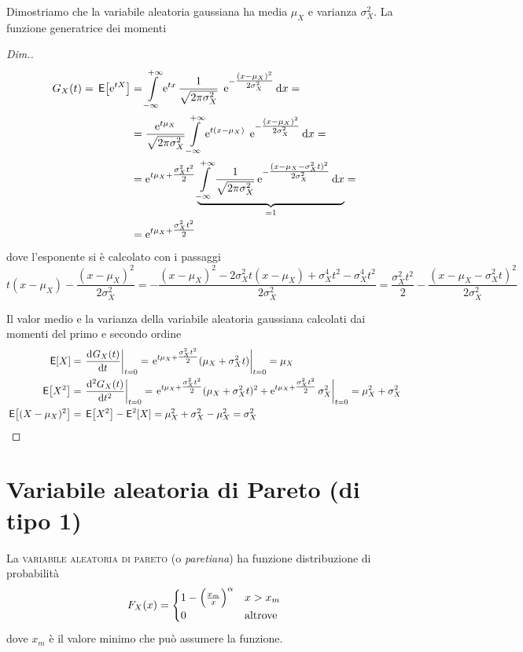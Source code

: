 Dimostriamo che la variabile aleatoria gaussiana ha media $\mu_X$ e varianza $\sigma^2_X$. La funzione generatrice dei momenti
\begin{proof}[Dim.]
\[\begin{split}G_X(t)=\,{\operatorname{\mathsf{E}}}\!\left[{\operatorname{e}^{t X}}\right]&=\int\limits_{-\infty}^{+\infty}{\operatorname{e}^{t x}\frac{1}{\sqrt{2\pi\sigma^2_X}}\;\operatorname{e}^{-\tfrac{(x-\mu_X)^2}{2\sigma^2_X}}}{\,\mathop{}\!\mathrm{d}{x}}=\\
&=\frac{\operatorname{e}^{t\mu_X}}{\sqrt{2\pi\sigma^2_X}}\int\limits_{-\infty}^{+\infty}{\operatorname{e}^{t (x-\mu_X)}\;\operatorname{e}^{-\tfrac{(x-\mu_X)^2}{2\sigma^2_X}}}{\,\mathop{}\!\mathrm{d}{x}}=\\
&=\operatorname{e}^{t\mu_X+\tfrac{\sigma^2_X t^2}{2}}\underbrace{\int\limits_{-\infty}^{+\infty}{\frac{1}{\sqrt{2\pi\sigma^2_X}}\operatorname{e}^{-\tfrac{(x-\mu_X-\sigma^2_X t)^2}{2\sigma^2_X}}}{\,\mathop{}\!\mathrm{d}{x}}}_{=1}=\\
&=\operatorname{e}^{t\mu_X+\tfrac{\sigma^2_X t^2}{2}}\end{split}\]
dove l'esponente si è calcolato con i passaggi
\[t(x-\mu_X)-\frac{(x-\mu_X)^2}{2\sigma^2_X}=-\frac{(x-\mu_X)^2-2\sigma^2_X t(x-\mu_X)+\sigma^4_X t^2-\sigma^4_X t^2}{2\sigma^2_X}=\frac{\sigma^2_X t^2}{2}-\frac{(x-\mu_X-\sigma^2_X t)^2}{2\sigma^2_X}\]

Il valor medio e la varianza della variabile aleatoria gaussiana calcolati dai momenti del primo e secondo ordine
\begin{equation}\begin{split}
\E{X}&=\restrict{\deriv{G_X(t)}{t}}{t=0}=\restrict{\e{t\mu_X+\tfrac{\sigma^2_X t^2}{2}}(\mu_X+\sigma^2_X t)}{t=0}=\mu_X
\\
\E{X^2}&=\restrict{\deriv[2]{G_X(t)}{t}}{t=0}=\restrict{\e{t\mu_X+\tfrac{\sigma^2_X t^2}{2}}(\mu_X+\sigma^2_X t)^2+\e{t\mu_X+\tfrac{\sigma^2_X t^2}{2}}\sigma^2_X}{t=0}=\mu^2_X+\sigma^2_X
\\\E{(X-\mu_X)^2}&=\E{X^2}-\Esp^2[X]=\mu^2_X+\sigma^2_X-\mu^2_X=\sigma^2_X
\end{split}
\end{equation}
\end{proof}

\section{Variabile aleatoria di Pareto (di tipo 1)}
La \textsc{variabile aleatoria di pareto} (o \emph{paretiana}) ha funzione distribuzione
di probabilità
\[
	F_X(x) =
	\begin{cases}
		1-\Bigl(\frac{x_m}{x}\Bigr)^\alpha & x > x_m \\
		0 & \text{altrove}
	\end{cases}
\]
dove \(x_m\) è il valore minimo che può assumere la funzione.

